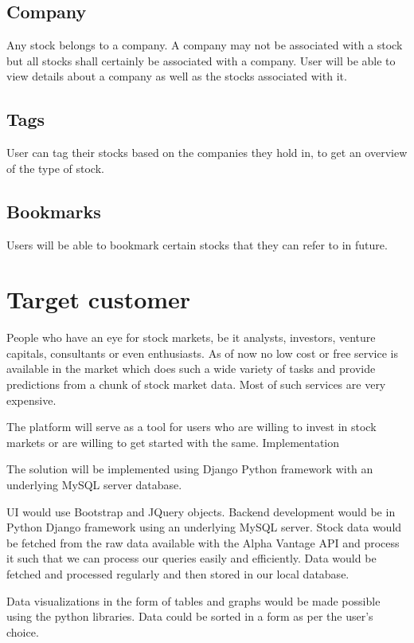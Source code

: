 \documentclass{report}
\begin{document}
\subsection{Company}
Any stock belongs to a company. A company may not be associated with a stock but all stocks shall certainly be associated with a company. User will be able to view details about a company as well as the stocks associated with it.

\subsection{Tags}
User can tag their stocks based on the companies they hold in, to get an overview of the type of stock.

\subsection{Bookmarks}
Users will be able to bookmark certain stocks that they can refer to in future.

\section{Target customer}

People who have an eye for stock markets, be it analysts, investors, venture capitals, consultants or even enthusiasts.
As of now no low cost or free service is available in the market which does such a wide variety of tasks and provide predictions from a chunk of stock market data. Most of such services are very expensive. 

The platform will serve as a tool for users who are willing to invest in stock markets or are willing to get started with the same. 
Implementation

The solution will be implemented using Django Python framework with an underlying MySQL server database.

UI would use Bootstrap and JQuery objects. Backend development would be in Python Django framework using an underlying MySQL server.
Stock data would be fetched from the raw data available with the Alpha Vantage API and process it such that we can process our queries easily and efficiently. Data would be fetched and processed regularly and then stored in our local database.

Data visualizations in the form of tables and graphs would be made possible using the python libraries. Data could be sorted in a form as per the user’s choice. 
\end{document}
